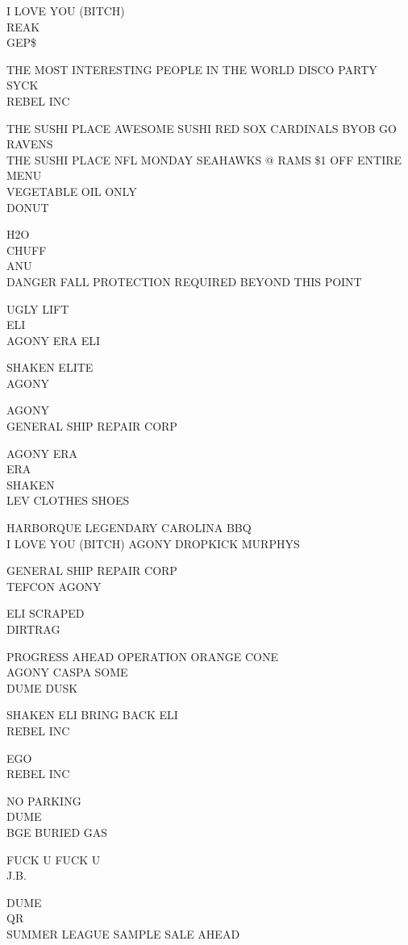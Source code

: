 \documentclass[10pt,letterpaper]{article}
\begin{document}
I LOVE YOU (BITCH)\\
REAK\\
GEP\$

THE MOST INTERESTING PEOPLE IN THE WORLD DISCO PARTY\\
SYCK\\
REBEL INC

THE SUSHI PLACE AWESOME SUSHI RED SOX CARDINALS BYOB GO RAVENS\\
THE SUSHI PLACE NFL MONDAY SEAHAWKS @ RAMS \$1 OFF ENTIRE MENU\\
VEGETABLE OIL ONLY\\
DONUT

H2O\\
CHUFF\\
ANU\\
DANGER FALL PROTECTION REQUIRED BEYOND THIS POINT

UGLY LIFT\\
ELI\\
AGONY ERA ELI

SHAKEN ELITE\\
AGONY

AGONY\\
GENERAL SHIP REPAIR CORP

AGONY ERA\\
ERA\\
SHAKEN\\
LEV CLOTHES SHOES

HARBORQUE LEGENDARY CAROLINA BBQ\\
I LOVE YOU (BITCH) AGONY DROPKICK MURPHYS

GENERAL SHIP REPAIR CORP\\
TEFCON AGONY

ELI SCRAPED\\
DIRTRAG

PROGRESS AHEAD OPERATION ORANGE CONE\\
AGONY CASPA SOME\\
DUME DUSK

SHAKEN ELI BRING BACK ELI\\
REBEL INC

EGO\\
REBEL INC

NO PARKING\\
DUME\\
BGE BURIED GAS

FUCK U FUCK U\\
J.B.

DUME\\
QR\\
SUMMER LEAGUE SAMPLE SALE AHEAD
\end{document}
